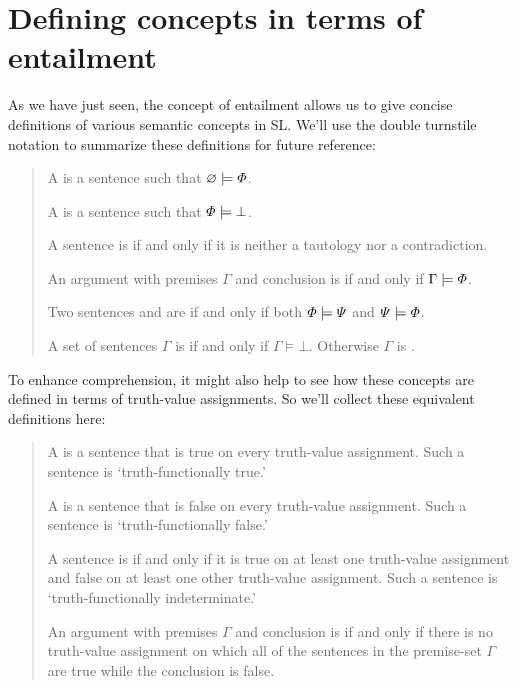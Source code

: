 {{\section{Defining concepts in terms of entailment}


As we have just seen, the concept of entailment allows us to give concise definitions of various semantic concepts in SL. We'll use the double turnstile notation to summarize these definitions for future reference:
\begin{quote}
A  is a sentence \metaA{}  such that $\varnothing\models\varPhi{}$.

A  is a sentence \metaA{} such that $\varPhi{}\models\bot$.

A sentence is  if and only if it is neither a tautology nor a contradiction.

An argument with premises $\Gamma$ and conclusion \metaA{} is  if and only if $\Gamma\models\varPhi{}$.

Two sentences \metaA{} and \metaB{} are  if and only if both $\varPhi{}\models\varPsi{}$ and $\varPsi{}\models\varPhi{}$.

A set of sentences $\Gamma$ is  if and only if $\Gamma\models \bot$. Otherwise $\Gamma$ is .\label{def.consistencySL}

 \end{quote}

To enhance comprehension, it might also help to see how these concepts are defined in terms of truth-value assignments. So we'll collect these equivalent definitions here: 

\begin{quote}
A  is a sentence \metaA{} that is true on every truth-value assignment. Such a sentence is `truth-functionally true.' 

A  is a sentence \metaA{} that is false on every truth-value assignment. Such a sentence is `truth-functionally false.' 

A sentence is  if and only if it is true on at least one truth-value assignment and false on at least one other truth-value assignment. Such a sentence is `truth-functionally indeterminate.' 

An argument with premises $\Gamma$ and conclusion \metaA{} is  if and only if there is no truth-value assignment on which all of the sentences in the premise-set $\Gamma$ are true while the conclusion \metaA{} is false. 


\end{quote}}}
